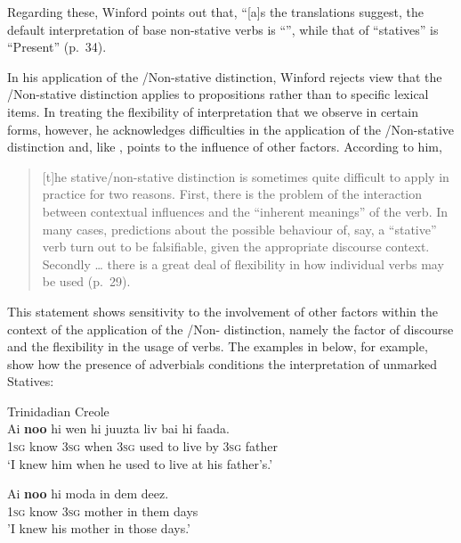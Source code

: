 Regarding these, Winford points out that, ``[a]s the translations
suggest, the default interpretation of base non-stative verbs is
``”, while that of ``statives” is ``Present” (p.~34).

In his application of the \slash Non-stative distinction, Winford
rejects  view that the \slash Non-stative
distinction applies to propositions rather than to specific lexical
items.  In treating the flexibility of interpretation that we observe
in certain forms, however, he acknowledges difficulties in the
application of the \slash Non-stative distinction and, like
\citet{Jaganauth1987}, points to the influence of other factors.
According to him,

\begin{quote}
[t]he stative\slash non-stative distinction is sometimes quite difficult to
apply in practice for two reasons.  First, there is the problem of the
interaction between contextual influences and the ``inherent meanings”
of the verb. In many cases, predictions about the possible behaviour
of, say, a ``stative” verb turn out to be falsifiable, given the
appropriate discourse context.  Secondly … there is a great deal of
flexibility in how individual verbs may be used (p.~29).
\end{quote}

This statement shows sensitivity to the involvement of other factors
within the context of the application of the \slash Non-
distinction, namely the factor of discourse and the flexibility in the
usage of verbs.  The examples in  below, for example, show
how the presence of adverbials conditions the interpretation of
unmarked Statives:

\ea%
\label{ex:2:17}
{Trinidadian Creole \citep[34--35]{Winford1993}}\\
\ea
     \gll Ai \textbf{noo}         hi     wen         hi     juuzta    liv   bai         hi   faada.\\  
\textsc{1sg}         know  \textsc{3sg}  when \textsc{3sg}  {used to}   live   by \textsc{3sg} father \\
\glt `I knew him when he used to live at his father’s.'

\ex
\gll    Ai \textbf{noo}          hi moda    in dem   deez.\\  
\textsc{1sg}       know \textsc{3sg} mother in them  days\\
\glt 'I knew his mother in those days.'

